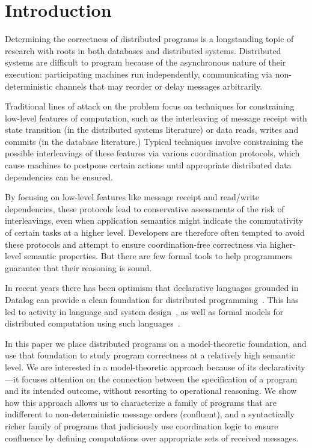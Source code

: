 \section{Introduction}
Determining the correctness of distributed programs is a longstanding topic of research with roots in both databases and distributed systems.  Distributed systems are difficult to program because of the asynchronous nature of their execution: participating machines run independently, communicating via non-deterministic channels that may reorder or delay messages arbitrarily.  

Traditional lines of attack on the problem focus on techniques for constraining low-level features of computation, such as the interleaving of message receipt with state transition (in the distributed systems literature) or data reads, writes and commits (in the database literature.)  Typical techniques involve constraining the possible interleavings of these features via various coordination protocols, which cause machines to postpone certain actions until appropriate distributed data dependencies can be ensured.

By focusing on low-level features like message receipt and read/write dependencies, these protocols lead to conservative assessments of the risk of interleavings, even when application semantics might indicate the commutativity of certain tasks at a higher level. Developers are therefore often tempted to avoid these protocols and attempt to ensure coordination-free correctness via higher-level semantic properties.  But there are few formal tools to help programmers guarantee that their reasoning is sound.

In recent years there has been optimism that declarative languages grounded in Datalog can provide a clean foundation for distributed programming~\cite{declarative-imperative}.  This has led to activity in language and system design~\cite{declarative-distributed-languages}, as well as formal models for distributed computation using such languages~\cite{transducers,what}.  

In this paper we place distributed programs on a model-theoretic foundation, and use that foundation to study program correctness at a relatively high semantic level.  We are interested in a model-theoretic approach because of its declarativity---it focuses attention on the connection between the specification of a program and its intended outcome, without resorting to operational reasoning.  We show how this approach allows us to characterize a family of programs that are indifferent to non-deterministic message orders (confluent), and a syntactically richer family of programs that judiciously use coordination logic to ensure confluence by defining computations over appropriate sets of received messages.

